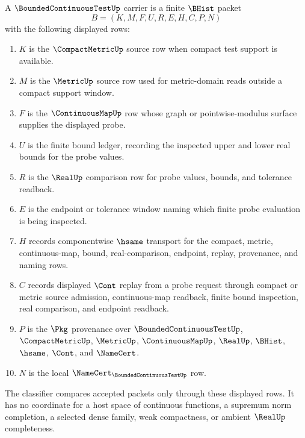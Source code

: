 \begin{definition}
\label{def:bounded-continuous-test-carrier}
A $\BoundedContinuousTestUp$ carrier is a finite $\BHist$ packet
$$
B=(K,M,F,U,R,E,H,C,P,N)
$$
with the following displayed rows:
\begin{enumerate}
\item $K$ is the $\CompactMetricUp$ source row when compact test support is
available.
\item $M$ is the $\MetricUp$ source row used for metric-domain reads outside a
compact support window.
\item $F$ is the $\ContinuousMapUp$ row whose graph or pointwise-modulus
surface supplies the displayed probe.
\item $U$ is the finite bound ledger, recording the inspected upper and lower
real bounds for the probe values.
\item $R$ is the $\RealUp$ comparison row for probe values, bounds, and
tolerance readback.
\item $E$ is the endpoint or tolerance window naming which finite probe
evaluation is being inspected.
\item $H$ records componentwise $\hsame$ transport for the compact, metric,
continuous-map, bound, real-comparison, endpoint, replay, provenance, and
naming rows.
\item $C$ records displayed $\Cont$ replay from a probe request through compact
or metric source admission, continuous-map readback, finite bound inspection,
real comparison, and endpoint readback.
\item $P$ is the $\Pkg$ provenance over $\BoundedContinuousTestUp$,
$\CompactMetricUp$, $\MetricUp$, $\ContinuousMapUp$, $\RealUp$, $\BHist$,
$\hsame$, $\Cont$, and $\NameCert$.
\item $N$ is the local $\NameCert_{\BoundedContinuousTestUp}$ row.
\end{enumerate}
The classifier compares accepted packets only through these displayed rows. It
has no coordinate for a host space of continuous functions, a supremum norm
completion, a selected dense family, weak compactness, or ambient $\RealUp$
completeness.
\end{definition}

